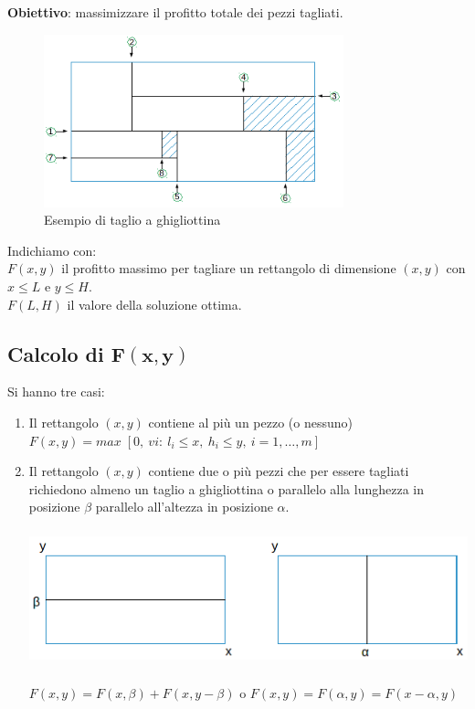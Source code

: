 \textbf{Obiettivo}: massimizzare il profitto totale dei pezzi tagliati.

\begin{figure}[h]
	\centering
	\includegraphics[height=5cm]{images/shape2.png}
	\caption{Esempio di taglio a ghigliottina}
\end{figure}
Indichiamo con:\\
$F(x,y)$ il profitto massimo per tagliare un rettangolo di dimensione $(x,y)$ con $x\le L$ e $y\le H$.\\
$F(L,H)$ il valore della soluzione ottima.

\subsection{Calcolo di $\boldsymbol{F(x,y)}$}
Si hanno tre casi:
\begin{enumerate}
	\item Il rettangolo $(x,y)$ contiene al più un pezzo (o nessuno) $F(x,y)=max\;[0,\ v{i}:\ l_{i}\le x,\ h_{i}\le y,\ i=1,\dots,m]$
	\item Il rettangolo $(x,y)$ contiene due o più pezzi che per essere tagliati richiedono almeno un taglio a ghigliottina o parallelo alla lunghezza in posizione $\beta$ parallelo all'altezza in posizione $\alpha$.
	\centerline{\includegraphics[height=4cm]{images/shape3.png}}
	$F(x,y)=F(x,\beta)+F(x,y-\beta)$ o $F(x,y)=F(\alpha,y)=F(x-\alpha,y)$
\end{enumerate}

